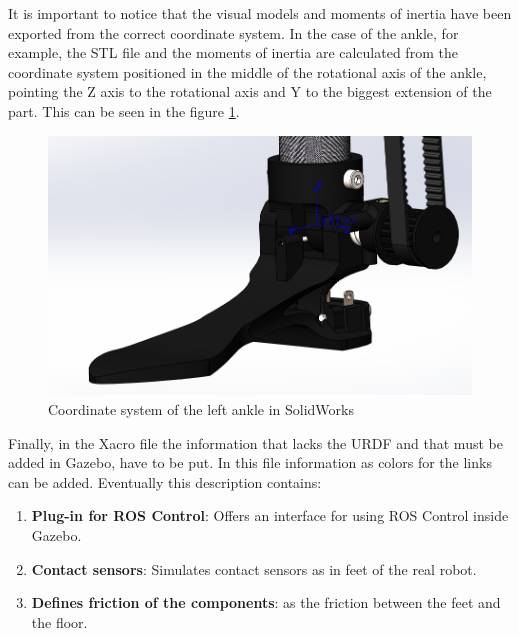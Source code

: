 It is important to notice that the visual models and moments of inertia have been exported from the correct coordinate system.
In the case of the ankle, for example, the STL file and the moments of inertia are calculated from the coordinate system positioned in the middle of the rotational axis of the ankle, pointing the Z axis to the rotational axis and Y to the biggest extension of the part.
This can be seen in the figure \ref{fig:solidworks_ankle_coodinate_system}.

\begin{figure}[ht!]
  \centering
  \includegraphics[width=0.9\linewidth]{figures/solidworks_ankle_coordinate_system}
  \caption{Coordinate system of the left ankle in SolidWorks}
  \label{fig:solidworks_ankle_coodinate_system}
\end{figure}

Finally, in the Xacro file the information that lacks the URDF and that must be added in Gazebo, have to be put.
In this file information as colors for the links can be added.
Eventually this description contains:
\begin{enumerate}
  \item \textbf{Plug-in for ROS Control}: Offers an interface for using ROS Control inside Gazebo.
  \item \textbf{Contact sensors}: Simulates contact sensors as in feet of the real robot.
  \item \textbf{Defines friction of the components}: as the friction between the feet and the floor.
\end{enumerate}

